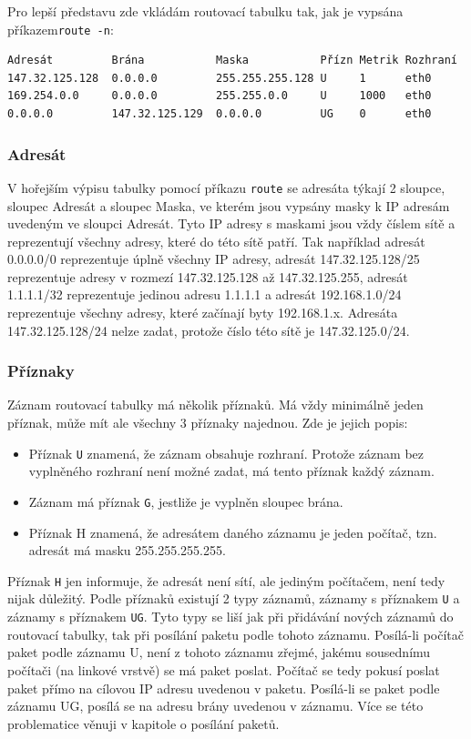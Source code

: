 Pro lepší představu zde vkládám routovací tabulku tak, jak je vypsána příkazem\linebreak \verb|route -n|:
\begin{verbatim}
Adresát         Brána           Maska           Přízn Metrik Rozhraní
147.32.125.128  0.0.0.0         255.255.255.128 U     1      eth0
169.254.0.0     0.0.0.0         255.255.0.0     U     1000   eth0
0.0.0.0         147.32.125.129  0.0.0.0         UG    0      eth0
\end{verbatim}

\subsubsection{Adresát}

V hořejším výpisu tabulky pomocí příkazu \verb|route| se adresáta týkají 2 sloupce, sloupec Adresát a sloupec Maska, ve kterém jsou vypsány masky k IP adresám uvedeným ve sloupci Adresát. Tyto IP adresy s maskami jsou vždy číslem sítě a reprezentují všechny adresy, které do této sítě patří. Tak například adresát 0.0.0.0/0 reprezentuje úplně všechny IP adresy, adresát 147.32.125.128/25 reprezentuje adresy v rozmezí 147.32.125.128 až 147.32.125.255, adresát 1.1.1.1/32 reprezentuje jedinou adresu 1.1.1.1 a adresát 192.168.1.0/24 reprezentuje všechny adresy, které začínají byty 192.168.1.x. Adresáta 147.32.125.128/24 nelze zadat, protože číslo této sítě je 147.32.125.0/24.

\subsubsection{Příznaky}\label{routTabulka-priznaky}

Záznam routovací tabulky má několik příznaků. Má vždy minimálně jeden příznak, může mít ale všechny 3 příznaky najednou. Zde je jejich popis:
\begin{itemize}
\item Příznak \verb|U| znamená, že záznam obsahuje rozhraní. Protože záznam bez vyplněného rozhraní není možné zadat, má tento příznak každý záznam.
\item Záznam má příznak \verb|G|, jestliže je vyplněn sloupec brána.
\item Příznak H znamená, že adresátem daného záznamu je jeden počítač, tzn. adresát má masku 255.255.255.255.
\end{itemize}
Příznak \verb|H| jen informuje, že adresát není sítí, ale jediným počítačem, není tedy nijak důležitý. Podle příznaků existují 2 typy záznamů, záznamy s příznakem \verb|U| a záznamy s příznakem \verb|UG|. Tyto typy se liší jak při přidávání nových záznamů do routovací tabulky, tak při posílání paketu podle tohoto záznamu. Posílá-li počítač paket podle záznamu U, není z tohoto záznamu zřejmé, jakému sousednímu počítači (na linkové vrstvě) se má paket poslat. Počítač se tedy pokusí poslat paket přímo na cílovou IP adresu uvedenou v paketu. Posílá-li se paket podle záznamu UG, posílá se na adresu brány uvedenou v záznamu. Více se této problematice věnuji v kapitole o posílání paketů.

